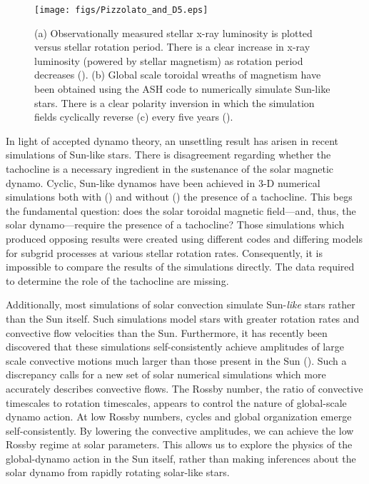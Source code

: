 \documentclass[aasms,12pt]{article}
\begin{document}
\begin{figure}[t!]
\centering
\texttt{[image: figs/Pizzolato\_and\_D5.eps]}
\caption{(a) Observationally measured stellar
        x-ray luminosity is plotted versus stellar rotation period.  There is a 
	clear increase in x-ray luminosity (powered by stellar magnetism) 
	as rotation
        period decreases (\citealt{Pizzolato2003}).  (b) Global scale toroidal 
	wreaths of magnetism have been obtained using the ASH code to numerically
	simulate Sun-like stars.  There is a clear polarity inversion in which the
	simulation fields cyclically reverse (c) every five years
        (\citealt{Brown2011}).
        \label{wreaths}}
\end{figure}


In light of accepted dynamo theory, an unsettling result has arisen
in recent simulations of Sun-like stars. There is disagreement regarding 
whether the tachocline is a necessary ingredient
in the sustenance of the solar magnetic dynamo.  Cyclic, Sun-like dynamos
have been
achieved in 3-D numerical simulations both with
(\citealt{Ghizaru2010, Racine2011})
and without (\citealt{Brown2011, Nelson2013}) the presence of a tachocline. This
begs the fundamental question: does the solar toroidal magnetic field---and, thus,
the solar dynamo---require the presence of a tachocline?
Those simulations which produced opposing
results were created using different codes and differing models for subgrid
processes at various stellar rotation rates.  Consequently, it is impossible to
compare the results of the simulations directly.  The data required
to determine the role of the tachocline are missing.

Additionally, most simulations
of solar convection simulate Sun-\emph{like} stars rather than the Sun
itself.  Such simulations model stars with greater rotation rates and 
convective flow velocities than the Sun.  Furthermore, it has recently 
been discovered
that these simulations self-consistently achieve amplitudes of 
large scale convective motions much larger than those present in 
the Sun
(\citealt{lord2014}).  Such a discrepancy calls for a new set of solar 
numerical simulations which more accurately describes convective flows.
The Rossby number, the ratio of convective timescales to rotation timescales,
appears to control the nature of global-scale dynamo action.  At low Rossby
numbers, cycles and global organization emerge self-consistently.  By lowering
the convective amplitudes, we can achieve the low Rossby regime at solar
parameters.  This allows us to explore the physics of the global-dynamo action
in the Sun itself, rather than making inferences about the solar dynamo from
rapidly rotating solar-like stars.
\end{document}
